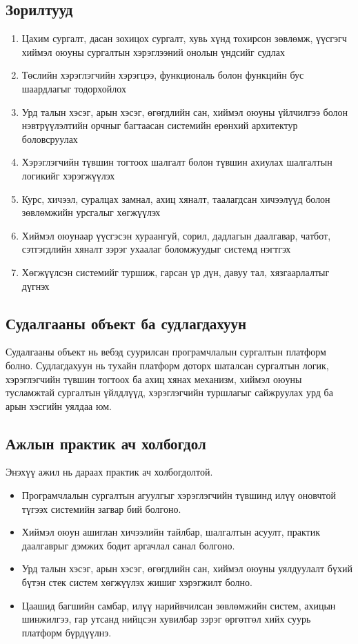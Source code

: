 \subsection*{Зорилтууд}
\begin{enumerate}[nosep]
\item Цахим сургалт, дасан зохицох сургалт, хувь хүнд тохирсон зөвлөмж, үүсгэгч хиймэл оюуны сургалтын хэрэглээний онолын үндсийг судлах
\item Төслийн хэрэглэгчийн хэрэгцээ, функциональ болон функцийн бус шаардлагыг тодорхойлох
\item Урд талын хэсэг, арын хэсэг, өгөгдлийн сан, хиймэл оюуны үйлчилгээ болон нэвтрүүлэлтийн орчныг багтаасан системийн ерөнхий архитектур боловсруулах
\item Хэрэглэгчийн түвшин тогтоох шалгалт болон түвшин ахиулах шалгалтын логикийг хэрэгжүүлэх
\item Курс, хичээл, суралцах замнал, ахиц хяналт, таалагдсан хичээлүүд болон зөвлөмжийн урсгалыг хөгжүүлэх
\item Хиймэл оюунаар үүсгэсэн хураангуй, сорил, дадлагын даалгавар, чатбот, сэтгэгдлийн хяналт зэрэг ухаалаг боломжуудыг системд нэгтгэх
\item Хөгжүүлсэн системийг туршиж, гарсан үр дүн, давуу тал, хязгаарлалтыг дүгнэх
\end{enumerate}

\subsection*{Судалгааны объект ба судлагдахуун}
Судалгааны объект нь вебэд суурилсан програмчлалын сургалтын платформ болно. Судлагдахуун нь тухайн платформ доторх шаталсан сургалтын логик, хэрэглэгчийн түвшин тогтоох ба ахиц хянах механизм, хиймэл оюуны тусламжтай сургалтын үйлдлүүд, хэрэглэгчийн туршлагыг сайжруулах урд ба арын хэсгийн уялдаа юм.

\subsection*{Ажлын практик ач холбогдол}
Энэхүү ажил нь дараах практик ач холбогдолтой.
\begin{itemize}
\item Програмчлалын сургалтын агуулгыг хэрэглэгчийн түвшинд илүү оновчтой түгээх системийн загвар бий болгоно.
\item Хиймэл оюун ашиглан хичээлийн тайлбар, шалгалтын асуулт, практик даалгаврыг дэмжих бодит аргачлал санал болгоно.
\item Урд талын хэсэг, арын хэсэг, өгөгдлийн сан, хиймэл оюуны уялдуулалт бүхий бүтэн стек систем хөгжүүлэх жишиг хэрэгжилт болно.
\item Цаашид багшийн самбар, илүү нарийвчилсан зөвлөмжийн систем, ахицын шинжилгээ, гар утсанд нийцсэн хувилбар зэрэг өргөтгөл хийх суурь платформ бүрдүүлнэ.
\end{itemize}

